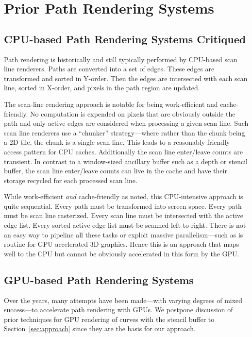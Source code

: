
\section{Prior Path Rendering Systems}
\label{sec:prior}

\subsection{CPU-based Path Rendering Systems Critiqued}

Path rendering is historically and still typically performed by
CPU-based scan line renderers.  Paths are converted into a set of edges.
These edges are transformed and sorted in Y-order.  Then the edges are
intersected with each scan line, sorted in X-order, and pixels in the
path region are updated.

The scan-line rendering approach is notable for being work-efficient
and cache-friendly.  No computation is expended on pixels that are
obviously outside the path and only active edges are considered when
processing a given scan line.  Such scan line renderers use a ``chunker''
strategy---where rather than the chunk being a 2D tile, the chunk is a
single scan line.  This leads to a reasonably friendly access pattern for
CPU caches.  Additionally the scan line enter/leave counts are transient.
In contrast to a window-sized ancillary buffer such as a depth or stencil
buffer, the scan line enter/leave counts can live in the cache and have
their storage recycled for each processed scan line.

While work-efficient {\em and} cache-friendly as noted, this CPU-intensive
approach is quite sequential.  Every path must be transformed into screen
space.  Every path must be scan line rasterized.  Every scan line must
be intersected with the active edge list.  Every sorted active edge list
must be scanned left-to-right.  There is not an easy way to pipeline
all these tasks or exploit massive parallelism---such as is routine for
GPU-accelerated 3D graphics.  Hence this is an approach that maps well
to the CPU but cannot be obviously accelerated in this form by the GPU.

\subsection{GPU-based Path Rendering Systems}

Over the years, many attempts have been made---with varying degrees of
mixed success---to accelerate path rendering with GPUs.
We postpone discussion of prior techniques for GPU rendering of curves with the stencil buffer
to Section~\ref{sec:approach} since they are the basis for our approach.

